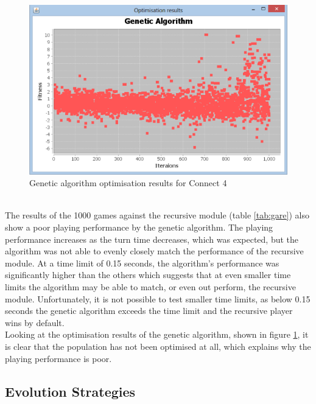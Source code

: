 \begin{figure}[tp]
   \begin{center}
     \includegraphics{Figures/gaconnect4}
   \end{center}
   \caption{Genetic algorithm optimisation results for Connect 4}
   \label{fig:gaconnect4}
\end{figure} 
\\The results of the 1000 games against the recursive module (table \ref{tab:gare}) also show a poor playing performance by the genetic algorithm. The playing performance increases as the turn time decreases, which was expected, but the algorithm was not able to evenly closely match the performance of the recursive module. At a time limit of 0.15 seconds, the algorithm's performance was significantly higher than the others which suggests that at even smaller time limits the algorithm may be able to match, or even out perform, the recursive module. Unfortunately, it is not possible to test smaller time limits, as below 0.15 seconds the genetic algorithm exceeds the time limit and the recursive player wins by default.
\\Looking at the optimisation results of the genetic algorithm, shown in figure \ref{fig:gaconnect4}, it is clear that the population has not been optimised at all, which explains why the playing performance is poor.

\subsection{Evolution Strategies}

